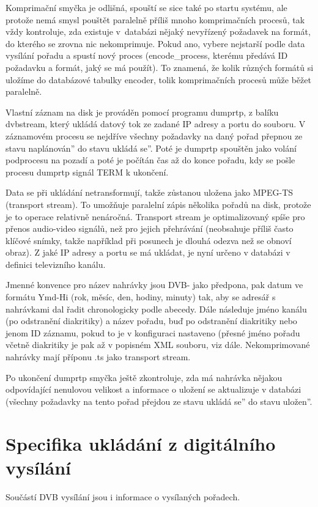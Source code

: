 Komprimační smyčka je odlišná, spouští se sice také po startu systému, ale protože nemá smysl pouštět paralelně příliš mnoho komprimačních procesů, tak vždy kontroluje, zda existuje v~databázi nějaký nevyřízený požadavek na formát, do kterého se zrovna nic nekomprimuje. Pokud ano, vybere nejstarší podle data vysílání pořadu a spustí nový proces (encode\_process, kterému předává ID požadavku a formát, jaký se má použít). To znamená, že kolik různých formátů si uložíme do databázové tabulky encoder, tolik komprimačních procesů může běžet paralelně.

Vlastní záznam na disk je prováděn pomocí programu dumprtp, z balíku dvbstream, který ukládá datový tok ze zadané IP adresy a portu do souboru. V záznamovém procesu se nejdříve všechny požadavky na daný pořad přepnou ze stavu \quotedblbase naplánován'' do stavu \quotedblbase ukládá se''. Poté je dumprtp spouštěn jako volání podprocesu na pozadí a poté je počítán čas až do konce pořadu, kdy se pošle procesu dumprtp signál TERM k ukončení. 

Data se při ukládání netransformují, takže zůstanou uložena jako MPEG-TS (transport stream). To umožňuje paralelní zápis několika pořadů na disk, protože je to operace relativně nenáročná. Transport stream je optimalizovaný spíše pro přenos audio-video signálů, než pro jejich přehrávání (neobsahuje příliš často klíčové snímky, takže například při posunech je dlouhá odezva než se obnoví obraz). Z jaké IP adresy a portu se má ukládat, je nyní určeno v databázi v definici televizního kanálu.

Jmenné konvence pro název nahrávky jsou DVB- jako předpona, pak datum ve formátu Ymd-Hi (rok, měsíc, den, hodiny, minuty) tak, aby se adresář s nahrávkami dal řadit chronologicky podle abecedy. Dále následuje jméno kanálu (po odstranění diakritiky) a název pořadu, buď po odstranění diakritiky nebo jenom ID záznamu, pokud to je v konfiguraci nastaveno (přesné jméno pořadu včetně diakritiky je pak až v popisném XML souboru, viz dále. Nekomprimované nahrávky mají příponu .ts jako transport stream.

Po ukončení dumprtp smyčka ještě zkontroluje, zda má nahrávka nějakou odpovídající nenulovou velikost a informace o uložení se aktualizuje v databázi (všechny požadavky na tento pořad přejdou ze stavu \quotedblbase ukládá se'' do stavu \quotedblbase uložen''.

\section{Specifika ukládání z digitálního vysílání}
Součástí DVB vysílání jsou i informace o vysílaných pořadech.

